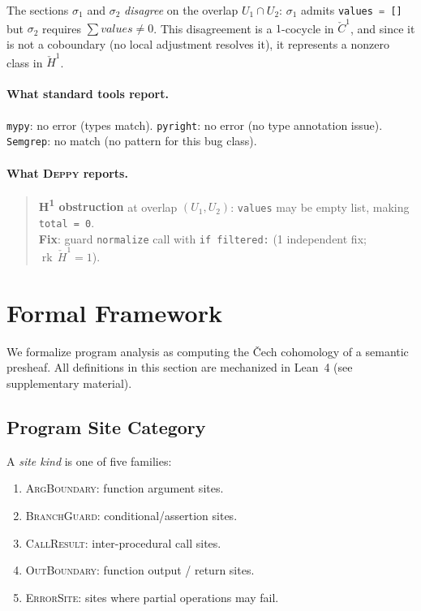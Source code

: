 \documentclass[acmsmall,screen]{acmart}
\theoremstyle{remark}
\newcommand{\CC}{\check{C}}
\newcommand{\Hc}[1]{\check{H}^{#1}}
\newcommand{\rk}{\operatorname{rk}}
\newcommand{\py}[1]{\lstinline[language=Python]{#1}}
\begin{document}
The sections $\sigma_1$ and $\sigma_2$ \emph{disagree} on the overlap
$U_1 \cap U_2$: $\sigma_1$ admits \py{values = []} but $\sigma_2$
requires $\sum \mathit{values} \neq 0$.  This disagreement is a
$1$-cocycle in $\CC^1$, and since it is not a coboundary (no local
adjustment resolves it), it represents a nonzero class in $\Hc{1}$.

\paragraph{What standard tools report.}
\texttt{mypy}: no error (types match).
\texttt{pyright}: no error (no type annotation issue).
\texttt{Semgrep}: no match (no pattern for this bug class).

\paragraph{What \textsc{Deppy} reports.}
\begin{quote}\small
\textbf{H\textsuperscript{1} obstruction} at overlap $(U_1, U_2)$:
\texttt{values} may be empty list, making \texttt{total = 0}.\\
\textbf{Fix}: guard \texttt{normalize} call with \texttt{if filtered:}
(1 independent fix; $\rk\,\Hc{1} = 1$).
\end{quote}

\section{Formal Framework}\label{sec:framework}

We formalize program analysis as computing the \v{C}ech cohomology of a
semantic presheaf.  All definitions in this section are mechanized in
Lean~4 (see supplementary material).

\subsection{Program Site Category}\label{sec:site-category}

\begin{definition}\label{def:site-kind}
A \emph{site kind} is one of five families:
\begin{enumerate}[nosep]
  \item \textsc{ArgBoundary}: function argument sites.
  \item \textsc{BranchGuard}: conditional/assertion sites.
  \item \textsc{CallResult}: inter-procedural call sites.
  \item \textsc{OutBoundary}: function output / return sites.
  \item \textsc{ErrorSite}: sites where partial operations may fail.
\end{enumerate}
\end{definition}
\end{document}
